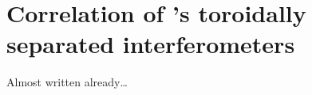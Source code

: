 \chapter{Correlation of \diiid's toroidally separated interferometers}

Almost written already\ldots
